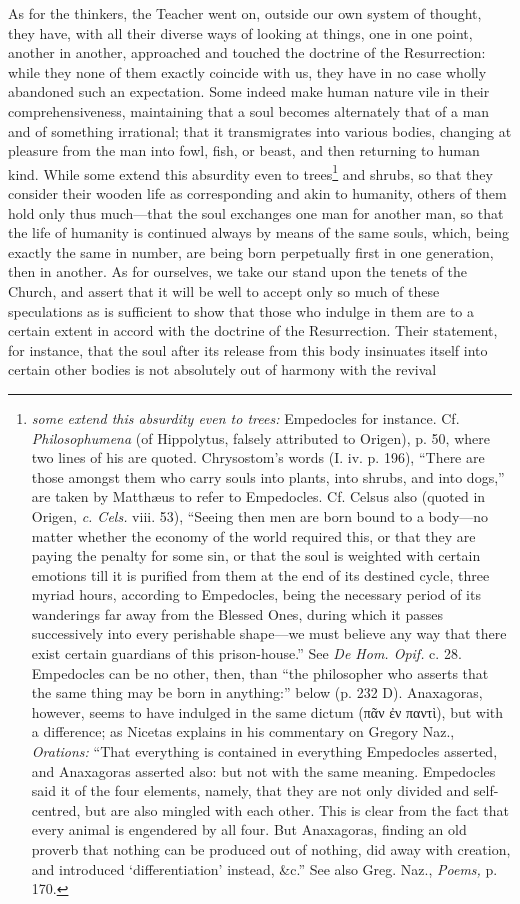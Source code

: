 As for the thinkers, the Teacher went on, outside our own system of thought, they have, with all their diverse ways of looking at things, one in one point, another in another, approached and touched the doctrine of the Resurrection: while they none of them exactly coincide with us, they have in no case wholly abandoned such an expectation. Some indeed make human nature vile in their comprehensiveness, maintaining that a soul becomes alternately that of a man and of something irrational; that it transmigrates into various bodies, changing at pleasure from the man into fowl, fish, or beast, and then returning to human kind. While some extend this absurdity even to trees\footnote{\emph{some extend this absurdity even to trees:} Empedocles for instance. Cf. \emph{Philosophumena} (of Hippolytus, falsely attributed to Origen), p. 50, where two lines of his are quoted. Chrysostom’s words (I. iv. p. 196), “There are those amongst them who carry souls into plants, into shrubs, and into dogs,” are taken by Matthæus to refer to Empedocles. Cf. Celsus also (quoted in Origen, \emph{c. Cels.} viii. 53), “Seeing then men are born bound to a body—no matter whether the economy of the world required this, or that they are paying the penalty for some sin, or that the soul is weighted with certain emotions till it is purified from them at the end of its destined cycle, three myriad hours, according to Empedocles, being the necessary period of its wanderings far away from the Blessed Ones, during which it passes successively into every perishable shape—we must believe any way that there exist certain guardians of this prison-house.” See \emph{De Hom. Opif.} c. 28. Empedocles can be no other, then, than “the philosopher who asserts that the same thing may be born in anything:” below (p. 232 D). Anaxagoras, however, seems to have indulged in the same dictum (\textgreek{πᾶν ἐν παντὶ}), but with a difference; as Nicetas explains in his commentary on Gregory Naz., \emph{Orations:} “That everything is contained in everything Empedocles asserted, and Anaxagoras asserted also: but not with the same meaning. Empedocles said it of the four elements, namely, that they are not only divided and self-centred, but are also mingled with each other. This is clear from the fact that every animal is engendered by all four. But Anaxagoras, finding an old proverb that nothing can be produced out of nothing, did away with creation, and introduced ‘differentiation’ instead, \&c.” See also Greg. Naz., \emph{Poems,} p. 170.} and shrubs, so that they consider their wooden life as corresponding and akin to humanity, others of them hold only thus much—that the soul exchanges one man for another man, so that the life of humanity is continued always by means of the same souls, which, being exactly the same in number, are being born perpetually first in one generation, then in another. As for ourselves, we take our stand upon the tenets of the Church, and assert that it will be well to accept only so much of these speculations as is sufficient to show that those who indulge in them are to a certain extent in accord with the doctrine of the Resurrection. Their statement, for instance, that the soul after its release from this body insinuates itself into certain other bodies is not absolutely out of harmony with the revival 